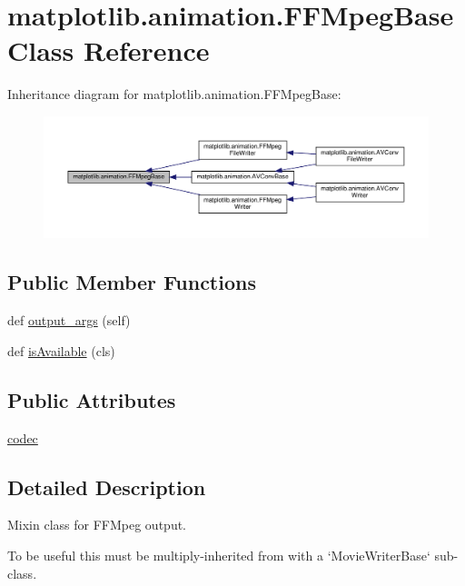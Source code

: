 \hypertarget{classmatplotlib_1_1animation_1_1FFMpegBase}{}\section{matplotlib.\+animation.\+F\+F\+Mpeg\+Base Class Reference}
\label{classmatplotlib_1_1animation_1_1FFMpegBase}


Inheritance diagram for matplotlib.\+animation.\+F\+F\+Mpeg\+Base\+:
\nopagebreak
\begin{figure}[H]
\begin{center}
\leavevmode
\includegraphics[width=350pt]{classmatplotlib_1_1animation_1_1FFMpegBase__inherit__graph}
\end{center}
\end{figure}
\subsection*{Public Member Functions}
\begin{DoxyCompactItemize}
\item 
def \hyperlink{classmatplotlib_1_1animation_1_1FFMpegBase_a8c23df9355366f801278bcbdba075652}{output\+\_\+args} (self)
\item 
def \hyperlink{classmatplotlib_1_1animation_1_1FFMpegBase_ac15a4871a79023f4899665bed49ac2c7}{is\+Available} (cls)
\end{DoxyCompactItemize}
\subsection*{Public Attributes}
\begin{DoxyCompactItemize}
\item 
\hyperlink{classmatplotlib_1_1animation_1_1FFMpegBase_a6c4de4708d8b848ffe2e558d7cbdcf0b}{codec}
\end{DoxyCompactItemize}


\subsection{Detailed Description}
\begin{DoxyVerb}Mixin class for FFMpeg output.

To be useful this must be multiply-inherited from with a
`MovieWriterBase` sub-class.
\end{DoxyVerb}
 

